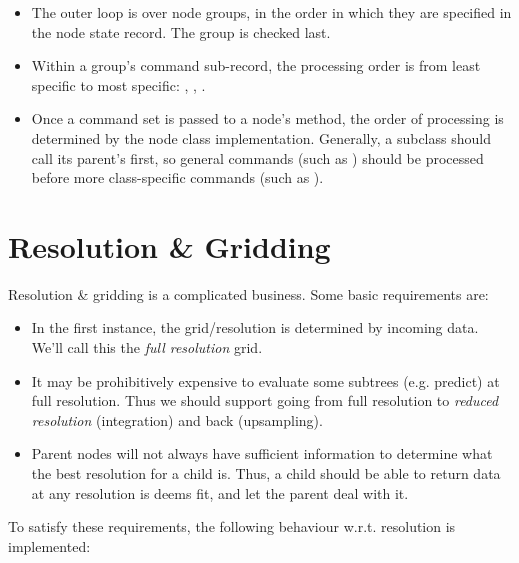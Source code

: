 \documentclass[10pt]{article}
\begin{document}
  \begin{itemize}
  
  \item The outer loop is over node groups, in the order in which they are
  specified in the node state record. The  group is checked last.
  
  \item Within a group's command sub-record, the processing order is from least
  specific to most specific: , ,
  .
  
  \item Once a command set is passed to a node's  method,
  the order of processing is determined by the node class implementation.
  Generally, a subclass should call its parent's  first,
  so general commands (such as ) should be processed before
  more class-specific commands (such as ).
  
  \end{itemize}
  
\section{Resolution \& Gridding}

  Resolution \& gridding is a complicated business. Some basic requirements
  are:

  \begin{itemize}
  
  \item In the first instance, the grid/resolution is determined by incoming
  data. We'll call this the {\em full resolution} grid.

  \item It may be prohibitively expensive to evaluate some subtrees (e.g.
  predict) at full resolution. Thus we should support going from full
  resolution to {\em reduced resolution} (integration) and back (upsampling). 
  
  \item Parent nodes will not always have sufficient information to determine
  what the best resolution for a child is. Thus, a child should be able to 
  return data at any resolution is deems fit, and let the parent deal with it.
  
  \end{itemize}
  
  To satisfy these requirements, the following behaviour w.r.t. resolution
  is implemented:
  
\end{document}
